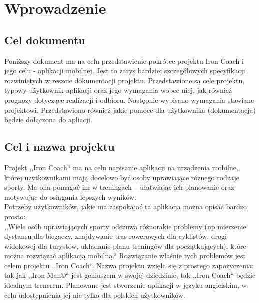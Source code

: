 

\tableofcontents
\clearpage
\section{Wprowadzenie}
\subsection{Cel dokumentu}
\noindent Poniższy dokument ma na celu przedstawienie pokrótce projektu Iron Coach i jego celu - aplikacji mobilnej. Jest to zarys bardziej szczegółowych specyfikacji rozwiniętych w reszcie dokumentacji projektu. Przedstawione są cele projektu, typowy użytkownik aplikacji oraz jego wymagania wobec niej, jak również prognozy dotyczące realizacji i odbioru. Następnie wypisano wymagania stawiane projektowi. Przedstawiono również jakie pomoce dla użytkownika (dokumentacja) będzie dołączona do apliacji.
\subsection{Cel i nazwa projektu}
\noindent Projekt ,,Iron Coach`` ma na celu napisanie aplikacji na urządzenia mobilne, której użytkownikami mają docelowo być osoby uprawiające różnego rodzaje sporty. Ma ona pomagać im w treningach -- ułatwiając ich planowanie oraz motywując do osiągania lepszych wyników. \\
Potrzeby użytkowników, jakie ma zaspokajać ta aplikacja można opisać bardzo prosto:\\ 
,,Wiele osób uprawiających sporty odczuwa różnorakie problemy (np mierzenie dystansu dla biegaczy, znajdywanie tras rowerowych dla cyklistów, drogi widokowej dla turystów, układanie planu treningów dla początkujących), które można rozwiązać aplikacją mobilną.``
Rozwiązanie właśnie tych problemów jest celem projektu ,,Iron Coach``. 
Nazwa projektu wzięła się z prostego zapożyczenia: tak jak ,,Iron Man©`` jest geniuszem w swojej dziedzinie, tak ,,Iron Coach`` będzie idealnym trenerem. Planowane jest stworzenie aplikacji w języku angielskim, w celu udostępnienia jej nie tylko dla polskich użytkowników.
